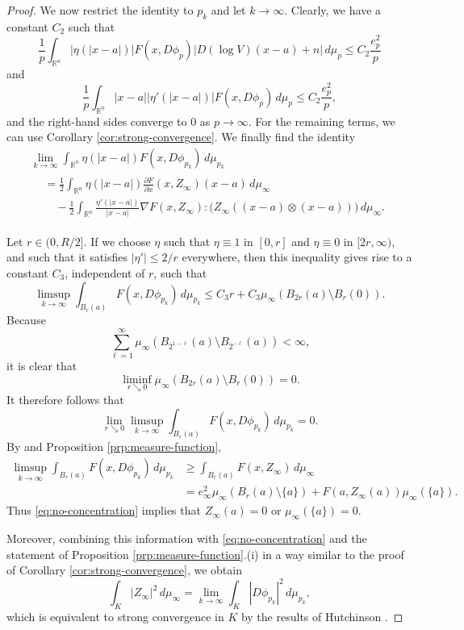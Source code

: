 \documentclass[a4paper]{article}
\newcommand{\R}{\mathbb{R}}
\newcommand{\grad}{\nabla}
\newcommand{\dd}[2]{\frac{\partial #1}{\partial #2}}
\theoremstyle{definition}
\theoremstyle{remark}
\begin{document}
\begin{proof}
We now restrict the identity to $p_k$ and let $k \to \infty$.
Clearly, we have  a constant $C_2$ such that
\[
\frac{1}{p} \int_{\R^n} |\eta(|x - a|)| F(x, D\phi_p) \left|D(\log V) (x - a) + n\right| \, d\mu_p \le C_2 \frac{e_p^2}{p}
\]
and
\[
\frac{1}{p} \int_{\R^n} |x - a| |\eta'(|x - a|)| F(x, D\phi_p) \, d\mu_p \le C_2 \frac{e_p^2}{p},
\]
and the right-hand sides converge to $0$ as $p \to \infty$.
For the remaining terms, we can use Corollary \ref{cor:strong-convergence}. We finally find
the identity
\begin{multline*}
\lim_{k \to \infty} \int_{\R^n} \eta(|x - a|) F(x, D\phi_{p_k}) \, d\mu_{p_k} \\
\begin{aligned}
& = \frac{1}{2} \int_{\R^n} \eta(|x - a|) \dd{F}{x}(x, Z_\infty) (x - a) \, d\mu_\infty \\
& \quad - \frac{1}{2} \int_{\R^n} \frac{\eta'(|x - a|)}{|x - a|} \grad F(x, Z_\infty) : \bigl(Z_\infty ((x - a) \otimes (x - a))\bigr) \, d\mu_\infty.
\end{aligned}
\end{multline*}

Let $r \in (0, R/2]$. If we choose $\eta$ such that $\eta \equiv 1$ in
$[0, r]$ and $\eta \equiv 0$ in $[2r, \infty)$, and such that it satisfies
$|\eta'| \le 2/r$ everywhere, then this inequality gives rise to a constant
$C_3$, independent of $r$, such that
\[
\limsup_{k \to \infty} \int_{B_r(a)} F(x, D\phi_{p_k}) \, d\mu_{p_k} \le C_3r + C_3\mu_\infty(B_{2r}(a) \setminus B_r(0)).
\]
Because
\[
\sum_{\ell = 1}^\infty \mu_\infty(B_{2^{1 - \ell}}(a) \setminus B_{2^{-\ell}}(a)) < \infty,
\]
it is clear that
\[
\liminf_{r \searrow 0} \mu_\infty(B_{2r}(a) \setminus B_r(0)) = 0.
\]
It therefore follows that
\begin{equation} \label{eq:no-concentration}
\lim_{r \searrow 0} \limsup_{k \to \infty} \int_{B_r(a)} F(x, D\phi_{p_k}) \, d\mu_{p_k} = 0.
\end{equation}
By \cite[Theorem 4.4.2]{Hutchinson:86} and Proposition \ref{prp:measure-function},
\[
\begin{split}
\limsup_{k \to \infty} \int_{B_r(a)} F(x, D\phi_{p_k}) \, d\mu_{p_k} & \ge \int_{B_r(a)} F(x, Z_\infty) \, d\mu_\infty \\
& = e_\infty^2 \mu_\infty(B_r(a) \setminus \{a\}) + F(a, Z_\infty(a)) \mu_\infty(\{a\}).
\end{split}
\]
Thus \eqref{eq:no-concentration} implies that $Z_\infty(a) = 0$ or $\mu_\infty(\{a\}) = 0$.

Moreover, combining this information with \eqref{eq:no-concentration} and the statement of Proposition \ref{prp:measure-function}.(i) in a way similar to the proof
of Corollary \ref{cor:strong-convergence}, we obtain
\[
\int_K |Z_\infty|^2 \, d\mu_\infty = \lim_{k \to \infty} \int_K |D\phi_{p_k}|^2 \, d\mu_{p_k},
\]
which is equivalent to strong convergence in $K$ by the results of Hutchinson \cite{Hutchinson:86}.
\end{proof}
\end{document}
